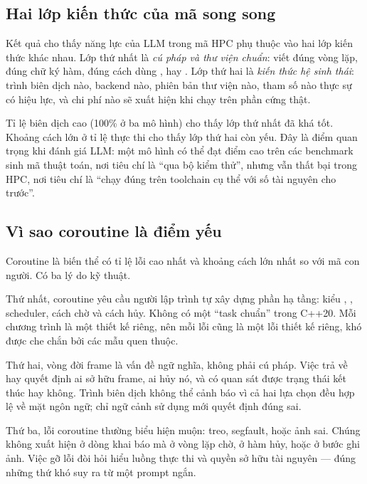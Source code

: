 \label{sec:thaoluan}

\subsection{Hai lớp kiến thức của mã song song}

Kết quả cho thấy năng lực của LLM trong mã HPC phụ thuộc vào hai lớp kiến thức
khác nhau. Lớp thứ nhất là \emph{cú pháp và thư viện chuẩn}: viết đúng vòng lặp,
đúng chữ ký hàm, đúng cách dùng , 
hay . Lớp thứ hai là \emph{kiến thức hệ sinh
thái}: trình biên dịch nào, backend nào, phiên bản thư viện nào, tham số nào thực
sự có hiệu lực, và chi phí nào sẽ xuất hiện khi chạy trên phần cứng thật.

Tỉ lệ biên dịch cao (100\% ở ba mô hình) cho thấy lớp thứ nhất đã khá tốt. Khoảng
cách lớn ở tỉ lệ thực thi cho thấy lớp thứ hai còn yếu. Đây là điểm quan trọng
khi đánh giá LLM: một mô hình có thể đạt điểm cao trên các benchmark sinh mã
thuật toán, nơi tiêu chí là “qua bộ kiểm thử”, nhưng vẫn thất bại trong HPC, nơi
tiêu chí là “chạy đúng trên toolchain cụ thể với số tài nguyên cho trước”.

\subsection{Vì sao coroutine là điểm yếu}

Coroutine là biến thể có tỉ lệ lỗi cao nhất và khoảng cách lớn nhất so với mã con
người. Có ba lý do kỹ thuật.

Thứ nhất, coroutine yêu cầu người lập trình tự xây dựng phần hạ tầng: kiểu
, , scheduler, cách chờ và cách hủy. Không có một
“task chuẩn” trong C++20. Mỗi chương trình là một thiết kế riêng, nên mỗi lỗi
cũng là một lỗi thiết kế riêng, khó được che chắn bởi các mẫu quen thuộc.

Thứ hai, vòng đời frame là vấn đề ngữ nghĩa, không phải cú pháp. Việc
 trả về  hay 
quyết định ai sở hữu frame, ai hủy nó, và  có quan sát được trạng
thái kết thúc hay không. Trình biên dịch không thể cảnh báo vì cả hai lựa chọn
đều hợp lệ về mặt ngôn ngữ; chỉ ngữ cảnh sử dụng mới quyết định đúng sai.

Thứ ba, lỗi coroutine thường biểu hiện muộn: treo, segfault, hoặc ảnh sai. Chúng
không xuất hiện ở dòng khai báo mà ở vòng lặp chờ, ở hàm hủy, hoặc ở bước ghi ảnh.
Việc gỡ lỗi đòi hỏi hiểu luồng thực thi và quyền sở hữu tài nguyên — đúng những
thứ khó suy ra từ một prompt ngắn.

